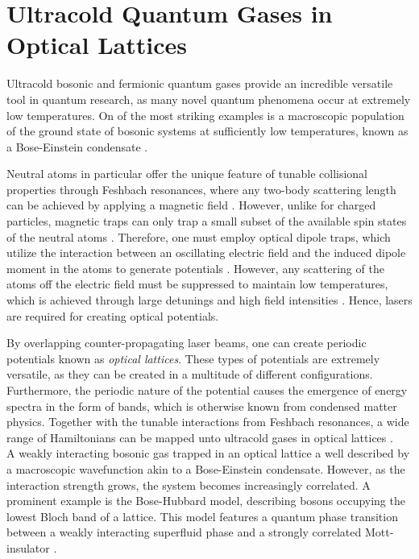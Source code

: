 \chapter{Ultracold Quantum Gases in Optical Lattices}

Ultracold bosonic and fermionic quantum gases provide an incredible versatile tool in quantum research, as many novel quantum phenomena occur at extremely low temperatures. On of the most striking examples is a macroscopic population of the ground state of bosonic systems at sufficiently low temperatures, known as a Bose-Einstein condensate \cite{WiemanCornell1995}.

Neutral atoms in particular offer the unique feature of tunable collisional properties through Feshbach resonances, where any two-body scattering length can be achieved by applying a magnetic field \cite{Inouye1998,Zwierlein2004}. However, unlike for charged particles, magnetic traps can only trap a small subset of the available spin states of the neutral atoms \cite{Bloch2005}. Therefore, one must employ optical dipole traps, which utilize the interaction between an oscillating electric field and the induced dipole moment in the atoms to generate potentials \cite{grimm}. However, any scattering of the atoms off the electric field must be suppressed to maintain low temperatures, which is achieved through large detunings and high field intensities \cite{manybodyBloch}. Hence, lasers are required for creating optical potentials.

By overlapping counter-propagating laser beams, one can create periodic potentials known as \textit{optical lattices}. These types of potentials are extremely versatile, as they can be created in a multitude of different configurations. Furthermore, the periodic nature of the potential causes the emergence of energy spectra in the form of bands, which is otherwise known from condensed matter physics. Together with the tunable interactions from Feshbach resonances, a wide range of Hamiltonians can be mapped unto ultracold gases in optical lattices \cite{JakschZoller, Bloch2012}.\\

A weakly interacting bosonic gas trapped in an optical lattice a well described by a macroscopic wavefunction akin to a Bose-Einstein condensate. However, as the interaction strength grows, the system becomes increasingly correlated. A prominent example is the Bose-Hubbard model, describing bosons occupying the lowest Bloch band of a lattice. This model features a quantum phase transition between a weakly interacting superfluid phase and a strongly correlated Mott-insulator \cite{Fisher1989}.

